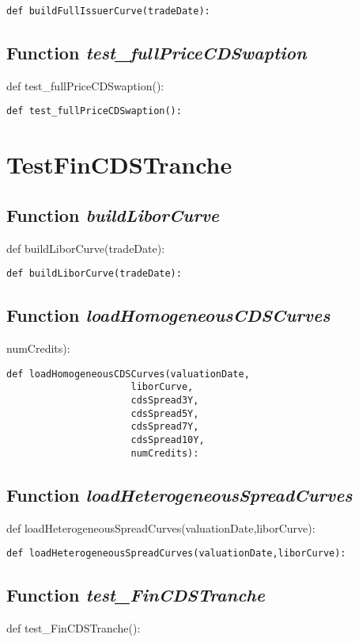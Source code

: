 \documentclass[twoside,11pt]{book}
\begin{document}
\begin{lstlisting}
def buildFullIssuerCurve(tradeDate):
\end{lstlisting}

\subsection{Function {\it test\_fullPriceCDSwaption}}
def test\_fullPriceCDSwaption():

\begin{lstlisting}
def test_fullPriceCDSwaption():
\end{lstlisting}


\newpage
\section{TestFinCDSTranche}

\subsection{Function {\it buildLiborCurve}}
def buildLiborCurve(tradeDate):

\begin{lstlisting}
def buildLiborCurve(tradeDate):
\end{lstlisting}

\subsection{Function {\it loadHomogeneousCDSCurves}}
numCredits):

\begin{lstlisting}
def loadHomogeneousCDSCurves(valuationDate,
                      liborCurve,
                      cdsSpread3Y,
                      cdsSpread5Y,
                      cdsSpread7Y,
                      cdsSpread10Y,
                      numCredits):
\end{lstlisting}

\subsection{Function {\it loadHeterogeneousSpreadCurves}}
def loadHeterogeneousSpreadCurves(valuationDate,liborCurve):

\begin{lstlisting}
def loadHeterogeneousSpreadCurves(valuationDate,liborCurve):
\end{lstlisting}

\subsection{Function {\it test\_FinCDSTranche}}
def test\_FinCDSTranche():
\end{document}
